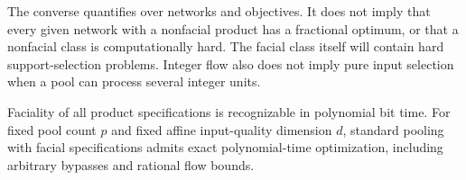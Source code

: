 The converse quantifies over networks and objectives. It does not imply
that every given network with a nonfacial product has a fractional
optimum, or that a nonfacial class is computationally hard. The facial
class itself will contain hard support-selection problems. Integer flow
also does not imply pure input selection when a pool can process several
integer units.

\begin{proposition}\label{s1:face-alg}
Faciality of all product specifications is recognizable in polynomial
bit time. For fixed pool count $p$ and fixed affine input-quality
dimension $d$, standard pooling with facial specifications admits exact
polynomial-time optimization, including arbitrary bypasses and rational
flow bounds.
\end{proposition}

